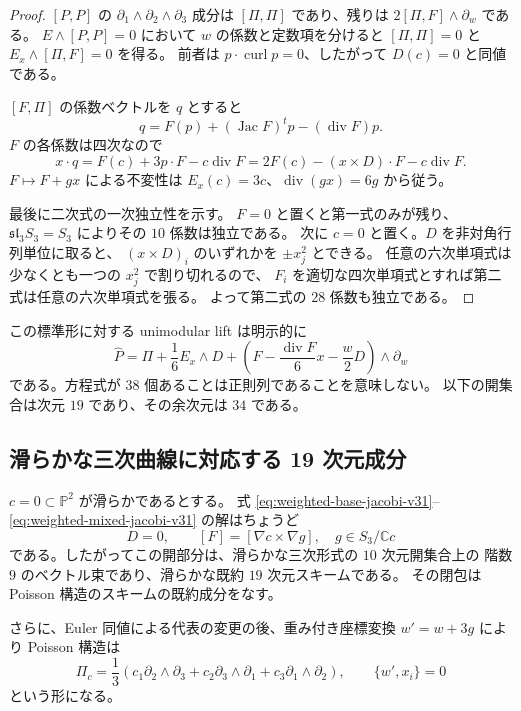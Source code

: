 \begin{proof}
$[P,P]$ の $\partial_1\wedge\partial_2\wedge\partial_3$ 成分は
$[\Pi,\Pi]$ であり、残りは $2[\Pi,F]\wedge\partial_w$ である。
$E\wedge[P,P]=0$ において $w$ の係数と定数項を分けると
$[\Pi,\Pi]=0$ と $E_x\wedge[\Pi,F]=0$ を得る。
前者は $p\cdot\operatorname{curl}p=0$、したがって $D(c)=0$ と同値である。

$[F,\Pi]$ の係数ベクトルを $q$ とすると
\[
 q=F(p)+(\operatorname{Jac}F)^tp-(\operatorname{div}F)p.
\]
$F$ の各係数は四次なので
\[
 x\cdot q=F(c)+3p\cdot F-c\operatorname{div}F
 =2F(c)-(x\times D)\cdot F-c\operatorname{div}F.
\]
$F\mapsto F+gx$ による不変性は
$E_x(c)=3c$、$\operatorname{div}(gx)=6g$ から従う。

最後に二次式の一次独立性を示す。
$F=0$ と置くと第一式のみが残り、
$\mathfrak{sl}_3S_3=S_3$ によりその $10$ 係数は独立である。
次に $c=0$ と置く。$D$ を非対角行列単位に取ると、
$(x\times D)_i$ のいずれかを $\pm x_j^2$ とできる。
任意の六次単項式は少なくとも一つの $x_j^2$ で割り切れるので、
$F_i$ を適切な四次単項式とすれば第二式は任意の六次単項式を張る。
よって第二式の $28$ 係数も独立である。
\end{proof}

この標準形に対する unimodular lift は明示的に
\[
 \widehat P
 =\Pi+\frac16E_x\wedge D
 +\left(F-\frac{\operatorname{div}F}{6}x-\frac w2D\right)
       \wedge\partial_w
\]
である。方程式が $38$ 個あることは正則列であることを意味しない。
以下の開集合は次元 $19$ であり、その余次元は $34$ である。

\subsection{滑らかな三次曲線に対応する 19 次元成分}

\begin{theorem}[滑らかな三次曲線上の標準形]
\label{thm:smooth-cubic-component-v31}
$c=0\subset\mathbb P^2$ が滑らかであるとする。
式 \eqref{eq:weighted-base-jacobi-v31}--\eqref{eq:weighted-mixed-jacobi-v31}
の解はちょうど
\[
 D=0,\qquad [F]=[\nabla c\times\nabla g],
 \quad g\in S_3/\mathbb Cc
\]
である。したがってこの開部分は、滑らかな三次形式の $10$ 次元開集合上の
階数 $9$ のベクトル束であり、滑らかな既約 $19$ 次元スキームである。
その閉包は Poisson 構造のスキームの既約成分をなす。

さらに、Euler 同値による代表の変更の後、重み付き座標変換
$w'=w+3g$ により Poisson 構造は
\[
 \Pi_c=\frac13\left(
 c_1\partial_2\wedge\partial_3+
 c_2\partial_3\wedge\partial_1+
 c_3\partial_1\wedge\partial_2\right),
 \qquad\{w',x_i\}=0
\]
という形になる。
\end{theorem}

